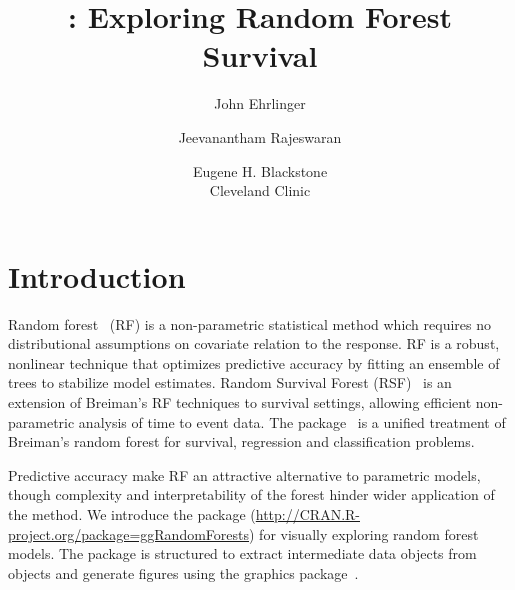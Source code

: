 \documentclass[nojss]{jss}
\author{John Ehrlinger \and Jeevanantham Rajeswaran \and Eugene H. Blackstone\\Cleveland Clinic }
\title{\pkg{ggRandomForests}: Exploring Random Forest Survival}
\begin{document}

\section{Introduction} \label{S:introduction}

Random forest~\citep{Breiman:2001} (RF) is a non-parametric statistical method which requires no distributional assumptions on covariate relation to the response. RF is a robust, nonlinear technique that optimizes predictive accuracy by fitting an ensemble of trees to stabilize model estimates. Random Survival Forest (RSF)~\citep{Ishwaran:2007a,Ishwaran:2008} is an extension of Breiman's RF techniques to survival settings, allowing efficient non-parametric analysis of time to event data. The  package~\citep[\url{http://CRAN.R-project.org/package=randomForestSRC}]{Ishwaran:RFSRC:2014} is a unified treatment of Breiman's random forest for survival, regression and classification problems.

Predictive accuracy make RF an attractive alternative to parametric models, though complexity and interpretability of the forest hinder wider application of the method. We introduce the  package  (\url{http://CRAN.R-project.org/package=ggRandomForests}) for visually exploring random forest models. The  package is structured to extract intermediate data objects from  objects and generate figures using the  graphics package~\citep[\url{http://CRAN.R-project.org/package=ggplot2}]{Wickham:2009}.
\end{document}
